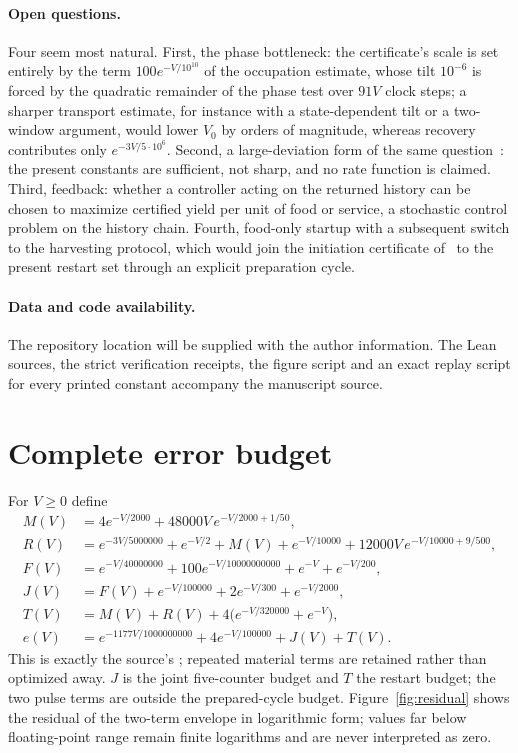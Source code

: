 \documentclass[11pt,a4paper]{article}
\newcommand{\RepositoryNote}{The repository location will be supplied with the author information.}
\theoremstyle{plain}
\theoremstyle{definition}
\theoremstyle{remark}
\begin{document}
\paragraph{Open questions.}
Four seem most natural. First, the phase bottleneck: the certificate's scale is set entirely by the term $100e^{-V/10^{10}}$ of the occupation estimate, whose tilt $10^{-6}$ is forced by the quadratic remainder of the phase test over $91V$ clock steps; a sharper transport estimate, for instance with a state-dependent tilt or a two-window argument, would lower $V_0$ by orders of magnitude, whereas recovery contributes only $e^{-3V/5\cdot10^6}$. Second, a large-deviation form of the same question~\citep{agazzi2018}: the present constants are sufficient, not sharp, and no rate function is claimed. Third, feedback: whether a controller acting on the returned history can be chosen to maximize certified yield per unit of food or service, a stochastic control problem on the history chain. Fourth, food-only startup with a subsequent switch to the harvesting protocol, which would join the initiation certificate of~\citep{thermo2026} to the present restart set through an explicit preparation cycle.

\paragraph{Data and code availability.}
\RepositoryNote{} The Lean sources, the strict verification receipts, the figure script and an exact replay script for every printed constant accompany the manuscript source.

\appendix
\section{Complete error budget}\label{app:error}
For $V\ge0$ define
\begin{align*}
M(V)&=4e^{-V/2000}+48000V\,e^{-V/2000+1/50},\\
R(V)&=e^{-3V/5000000}+e^{-V/2}+M(V)+e^{-V/10000}+12000V\,e^{-V/10000+9/500},\\
F(V)&=e^{-V/40000000}+100e^{-V/10000000000}+e^{-V}+e^{-V/200},\\
J(V)&=F(V)+e^{-V/100000}+2e^{-V/300}+e^{-V/2000},\\
T(V)&=M(V)+R(V)+4\bigl(e^{-V/320000}+e^{-V}\bigr),\\
e(V)&=e^{-1177V/1000000000}+4e^{-V/100000}+J(V)+T(V).
\end{align*}
This is exactly the source's ; repeated material terms are retained rather than optimized away. $J$ is the joint five-counter budget and $T$ the restart budget; the two pulse terms are outside the prepared-cycle budget. Figure~\ref{fig:residual} shows the residual of the two-term envelope in logarithmic form; values far below floating-point range remain finite logarithms and are never interpreted as zero.
\end{document}
